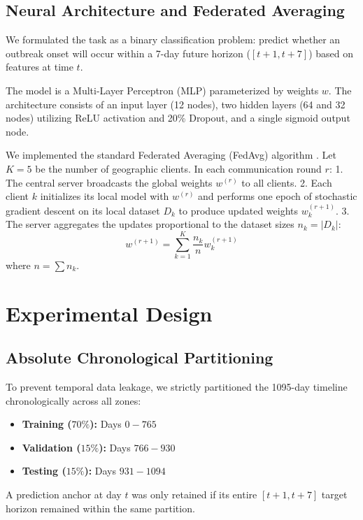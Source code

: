 \documentclass[conference]{IEEEtran}
\begin{document}
\subsection{Neural Architecture and Federated Averaging}
We formulated the task as a binary classification problem: predict whether an outbreak onset will occur within a 7-day future horizon ($[t+1, t+7]$) based on features at time $t$. 

The model is a Multi-Layer Perceptron (MLP) parameterized by weights $w$. The architecture consists of an input layer (12 nodes), two hidden layers (64 and 32 nodes) utilizing ReLU activation and 20\% Dropout, and a single sigmoid output node.

We implemented the standard Federated Averaging (FedAvg) algorithm \cite{b5}. Let $K=5$ be the number of geographic clients. In each communication round $r$:
1. The central server broadcasts the global weights $w^{(r)}$ to all clients.
2. Each client $k$ initializes its local model with $w^{(r)}$ and performs one epoch of stochastic gradient descent on its local dataset $D_k$ to produce updated weights $w_k^{(r+1)}$.
3. The server aggregates the updates proportional to the dataset sizes $n_k = |D_k|$:
\begin{equation}
    w^{(r+1)} = \sum_{k=1}^{K} \frac{n_k}{n} w_k^{(r+1)}
\end{equation}
where $n = \sum n_k$.

\section{Experimental Design}

\subsection{Absolute Chronological Partitioning}
To prevent temporal data leakage, we strictly partitioned the 1095-day timeline chronologically across all zones:
\begin{itemize}
    \item \textbf{Training ($70\%$):} Days $0 - 765$
    \item \textbf{Validation ($15\%$):} Days $766 - 930$
    \item \textbf{Testing ($15\%$):} Days $931 - 1094$
\end{itemize}
A prediction anchor at day $t$ was only retained if its entire $[t+1, t+7]$ target horizon remained within the same partition. 
\end{document}

